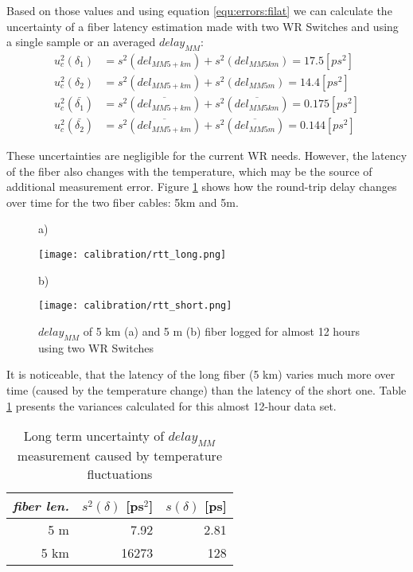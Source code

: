 Based on those values and using equation \ref{equ:errors:filat} we can calculate
the uncertainty of a fiber latency estimation made with two WR Switches and
using a single sample or an averaged $delay_{MM}$:
\begin{align}
	\label{equ:errors:f1lat}
  u_c^2(\delta_1) &= s^2(del_{MM5+km}) + s^2(del_{MM5km}) = 17.5 [ps^2]\\
	u_c^2(\delta_2) &= s^2(del_{MM5+km}) + s^2(del_{MM5m}) = 14.4 [ps^2]\\
	u_c^2(\bar{\delta_1}) &= s^2(\overline{del_{MM5+km}}) + s^2(\overline{del_{MM5km}}) = 0.175 [ps^2]\\
	u_c^2(\bar{\delta_2}) &= s^2(\overline{del_{MM5+km}}) + s^2(\overline{del_{MM5m}}) = 0.144 [ps^2]
\end{align}

These uncertainties are negligible for the current WR needs. However, the
latency of the fiber also changes with the temperature, which may be the source
of additional measurement error. Figure \ref{fig:errors:deltemp} shows how the
round-trip delay changes over time for the two fiber cables: 5km and 5m. 

\begin{center}
\begin{figure}[ht]
a)
\begin{minipage}{.5\textwidth}
	\texttt{[image: calibration/rtt\_long.png]}
\end{minipage}
b)
\begin{minipage}{.5\textwidth}
	\texttt{[image: calibration/rtt\_short.png]}
\end{minipage}
\caption{$delay_{MM}$ of 5 km (a) and 5 m (b) fiber logged for almost 12 hours using two WR Switches}
\label{fig:errors:deltemp}
\end{figure}
\end{center}

It is noticeable, that the latency of the long fiber (5 km) varies much more
over time (caused by the temperature change) than the latency of the short one.
Table \ref{tab:errors:deltemp} presents the variances calculated for this almost
12-hour data set.
\renewcommand{\arraystretch}{1.2}
\begin{table}[ht]
	\begin{center}
	\begin{tabular}{|r|r|r|}
	\hline
  \emph{fiber len.} & $s^2(\delta)$ [ps$^2$] & $s(\delta)$ [ps]\\
	\hline
	5 m & 7.92 & 2.81\\
	\hline
	5 km & 16273 & 128\\
	\hline
	\end{tabular}
	\caption{Long term uncertainty of $delay_{MM}$ measurement caused by temperature fluctuations}
	\label{tab:errors:deltemp}
	\end{center}
\end{table}
\renewcommand{\arraystretch}{1}

